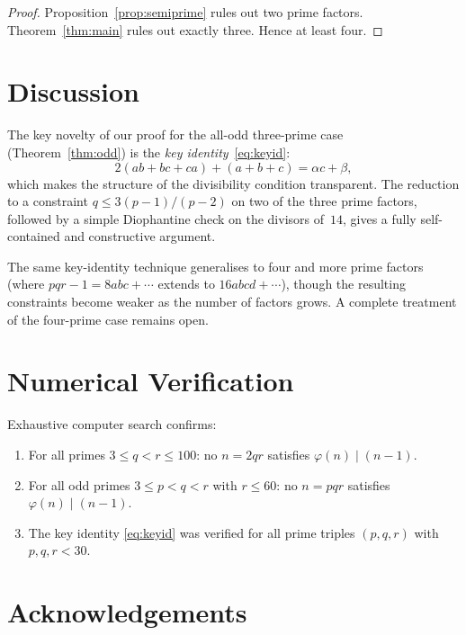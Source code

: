 \documentclass[12pt,a4paper]{amsart}
\theoremstyle{definition}
\newcommand{\euler}{\varphi}
\begin{document}
\begin{proof}
Proposition~\ref{prop:semiprime} rules out two prime factors.
Theorem~\ref{thm:main} rules out exactly three.  Hence at least four.
\end{proof}

\section{Discussion}

The key novelty of our proof for the all-odd three-prime case
(Theorem~\ref{thm:odd}) is the \emph{key identity}~\eqref{eq:keyid}:
\[
  2(ab + bc + ca) + (a + b + c) = \alpha c + \beta,
\]
which makes the structure of the divisibility condition transparent.  The
reduction to a constraint $q \le 3(p-1)/(p-2)$ on two of the three prime
factors, followed by a simple Diophantine check on the divisors of~$14$,
gives a fully self-contained and constructive argument.

The same key-identity technique generalises to four and more prime factors
(where $pqr-1 = 8abc + \cdots$ extends to $16abcd + \cdots$), though the
resulting constraints become weaker as the number of factors grows.  A
complete treatment of the four-prime case remains open.

\section{Numerical Verification}

Exhaustive computer search confirms:
\begin{enumerate}
  \item For all primes $3 \le q < r \le 100$: no $n = 2qr$ satisfies
        $\euler(n) \mid (n-1)$.
  \item For all odd primes $3 \le p < q < r$ with $r \le 60$: no $n = pqr$
        satisfies $\euler(n) \mid (n-1)$.
  \item The key identity \eqref{eq:keyid} was verified for all prime triples
        $(p, q, r)$ with $p, q, r < 30$.
\end{enumerate}

\section*{Acknowledgements}
\end{document}
